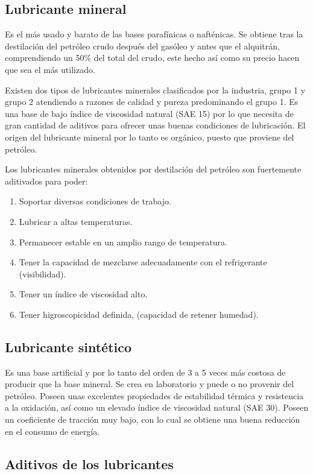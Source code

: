 \documentclass[../main]{subfiles}
\begin{document}
\subsection{Lubricante mineral}

Es el más usado y barato de las bases parafínicas o nafténicas. Se obtiene tras la destilación del petróleo crudo después del gasóleo y antes que el alquitrán, comprendiendo un 50\% del total del crudo, este hecho así como su precio hacen que sea el más utilizado.

Existen dos tipos de lubricantes minerales clasificados por la industria, grupo 1 y grupo 2 atendiendo a razones de calidad y pureza predominando el grupo 1. Es una base de bajo índice de viscosidad natural (SAE 15) por lo que necesita de gran cantidad de aditivos para ofrecer unas buenas condiciones de lubricación. El origen del lubricante mineral por lo tanto es orgánico, puesto que proviene del petróleo.

Los lubricantes minerales obtenidos por destilación del petróleo son fuertemente aditivados para poder:
\begin{enumerate}
    
\item Soportar diversas condiciones de trabajo.
\item Lubricar a altas temperaturas.
\item Permanecer estable en un amplio rango de temperatura.
\item Tener la capacidad de mezclarse adecuadamente con el refrigerante (visibilidad).
\item Tener un índice de viscosidad alto.
\item Tener higroscopicidad definida, (capacidad de retener humedad).
\end{enumerate}

\subsection{Lubricante sintético}
Es una base artificial y por lo tanto del orden de 3 a 5 veces más costosa de producir que la base mineral. Se crea en laboratorio y puede o no provenir del petróleo. Poseen unas excelentes propiedades de estabilidad térmica y resistencia a la oxidación, así como un elevado índice de viscosidad natural (SAE 30). Poseen un coeficiente de tracción muy bajo, con lo cual se obtiene una buena reducción en el consumo de energía.

    
\subsection{Aditivos de los lubricantes}
\end{document}
